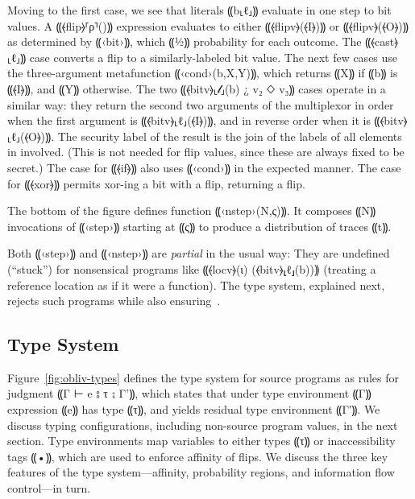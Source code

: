 Moving to the first case, we see that literals ⸨b⸤ℓ⸥⸩ evaluate in one
step to bit values. A ⸨⦑flip⦒⸢ρ⸣()⸩ expression evaluates to either
⸨⦑flipv⦒(⦑I⦒)⸩ or ⸨⦑flipv⦒(⦑O⦒)⸩ as determined by ⸨‹bit›⸩, which ⸨½⸩
probability for each outcome.
%
The ⸨⦑cast⦒⸤ℓ⸥⸩ case converts a flip to a similarly-labeled bit value.
%
The next few cases use the three-argument metafunction ⸨‹cond›(b,X,Y)⸩, which
returns ⸨X⸩ if ⸨b⸩ is ⸨⦑I⦒⸩, and ⸨Y⸩ otherwise.
%
The two ⸨⦑bitv⦒⸤𝓁⸥(b) ¿ v₂ ◇ v₃⸩ cases operate in a similar way: they return the
second two arguments of the multiplexor in order when the first
argument is ⸨⦑bitv⦒⸤ℓ⸥(⦑I⦒)⸩, and in reverse order when it is
⸨⦑bitv⦒⸤ℓ⸥(⦑O⦒)⸩. The security label of the result is the join of the labels of
all elements in involved. (This is not needed for flip values, since these are
always fixed to be secret.)
%
The case for ⸨⦑if⦒⸩ also uses ⸨‹cond›⸩ in the expected manner. The
case for ⸨⦑xor⦒⸩ permits xor-ing a bit with a flip, returning a
flip.

The bottom of the figure defines function ⸨‹nstep›(N,ς)⸩. It composes ⸨N⸩
invocations of ⸨‹step›⸩ starting at ⸨ς⸩ to produce a distribution of traces ⸨t⸩.

Both ⸨‹step›⸩ and ⸨‹nstep›⸩ are \emph{partial} in the usual way:
They are undefined (``stuck'') for nonsensical programs like
⸨⦑locv⦒(ι) (⦑bitv⦒⸤ℓ⸥(b))⸩ (treating a reference location as if it were
a function). The \obliv type system, explained next, rejects
such programs while also ensuring~.


\subsection{Type System}
\label{subsec:obliv-design-types}

Figure~\ref{fig:obliv-types} defines the type system for \obliv source programs
as rules for judgment ⸨Γ ⊢ e ⦂ τ ⨟ Γ'⸩, which states that under type
environment ⸨Γ⸩ expression ⸨e⸩ has type ⸨τ⸩, and yields residual type
environment ⸨Γ′⸩. We discuss typing configurations, including non-source
program values, in the next section. Type environments map variables to either
types ⸨τ⸩ or inaccessibility tags ⸨•⸩, which are used to enforce
affinity of flips. We discuss the three key features of the type
system---affinity, probability regions, and information flow
control---in turn.

